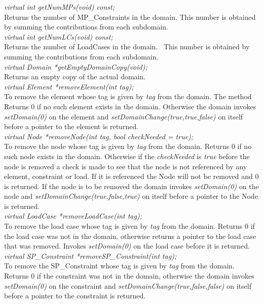 {\em virtual int getNumMPs(void) const;}\\
Returns the number of MP\_Constraints in the domain. 
This number is obtained by summing the contributions from each subdomain. \\

{\em virtual int getNumLCs(void) const;}\\    
Returns the number of LoadCases in the domain. \
This number is obtained by summing the contributions from each subdomain. \\

{\em virtual Domain *getEmptyDomainCopy(void);}\\
Returns an empty copy of the actual domain.\\

{\em virtual Element *removeElement(int tag);}\\
To remove the element whose tag is given by {\em tag} from the
domain. The method Returns $0$ if no such element exists in the domain. Otherwise 
the domain invokes {\em setDomain(0)} on the element and {\em
setDomainChange(true,true,false)} on itself before a pointer to the
element is returned. \\

{\em virtual Node *removeNode(int tag, bool checkNeeded = true);}\\    
To remove the node whose tag is given by {\em tag} from the domain. 
Returns $0$ if no such node exists in the domain. Otherwise
if the {\em checkNeeded} is {\em true} before the node is removed a
check is made to see that the node is not referenced by any element,
constraint or load. If it is referenced the Node will not be
removed and $0$ is returned. If the node is to be removed the domain
invokes {\em setDomain(0)} on the node and {\em
setDomainChange(true,false,true)} on itself before a pointer to the
Node is returned.\\

{\em virtual LoadCase *removeLoadCase(int tag);}\\        
To remove the load case whose tag is given by {\em tag} from the domain. 
Returns $0$ if the load case was not in the domain, otherwise
returns a pointer to the load case that was removed. Invokes {\em
setDomain(0)} on the load case before it is returned.\\

{\em virtual SP\_Constraint *removeSP\_Constraint(int tag);}\\
To remove the SP\_Constraint whose tag is given by {\em tag} from the
domain. Returns $0$ if the constraint was not in the domain, otherwise
the domain invokes {\em setDomain(0)} on the constraint and {\em
setDomainChange(true,false,false)} on itself before a pointer to the
constraint is returned.\\  

